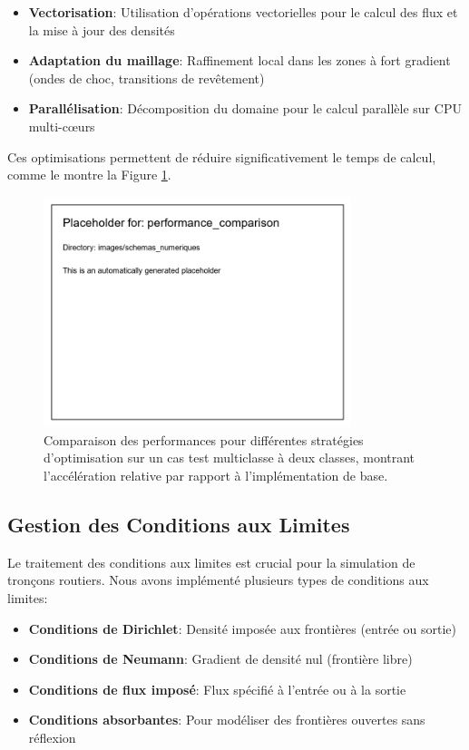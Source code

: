 \begin{itemize}
\item \textbf{Vectorisation}: Utilisation d'opérations vectorielles pour le calcul des flux et la mise à jour des densités
\item \textbf{Adaptation du maillage}: Raffinement local dans les zones à fort gradient (ondes de choc, transitions de revêtement)
\item \textbf{Parallélisation}: Décomposition du domaine pour le calcul parallèle sur CPU multi-cœurs
\end{itemize}

Ces optimisations permettent de réduire significativement le temps de calcul, comme le montre la Figure \ref{fig:performance}.

\begin{figure}[htbp]
\centering
\includegraphics[width=0.8\textwidth]{images/schemas_numeriques/performance_comparison}
\caption{Comparaison des performances pour différentes stratégies d'optimisation sur un cas test multiclasse à deux classes, montrant l'accélération relative par rapport à l'implémentation de base.}
\label{fig:performance}
\end{figure}

\subsection{Gestion des Conditions aux Limites}
\label{subsec:conditions_limites}

Le traitement des conditions aux limites est crucial pour la simulation de tronçons routiers. Nous avons implémenté plusieurs types de conditions aux limites:

\begin{itemize}
\item \textbf{Conditions de Dirichlet}: Densité imposée aux frontières (entrée ou sortie)
\item \textbf{Conditions de Neumann}: Gradient de densité nul (frontière libre)
\item \textbf{Conditions de flux imposé}: Flux spécifié à l'entrée ou à la sortie
\item \textbf{Conditions absorbantes}: Pour modéliser des frontières ouvertes sans réflexion
\end{itemize}

